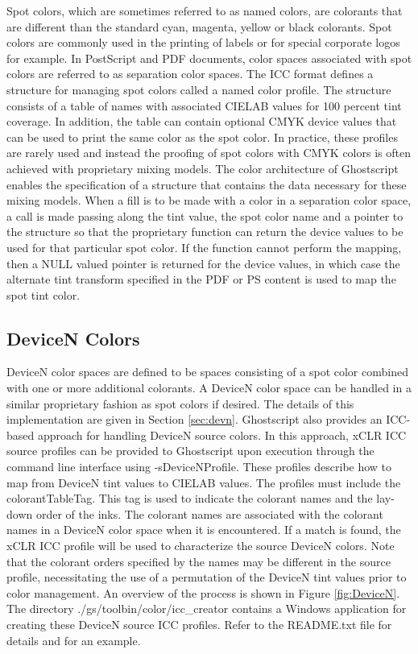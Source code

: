 \documentclass[12pt,notitlepage]{article}
\begin{document}
Spot colors, which are sometimes referred to as named colors, are colorants that are different than the standard cyan, magenta, yellow or black colorants.  Spot colors are commonly used in the printing of labels or for special corporate logos for example.  In PostScript and PDF documents, color spaces associated with spot colors are referred to as separation color spaces.  The ICC format defines a structure for managing spot colors called a named color profile.  The structure consists of a table of names with associated CIELAB values for 100 percent tint coverage.  In addition, the table can contain optional CMYK device values that can be used to print the same color as the spot color.  In practice, these profiles are rarely used and instead the proofing of spot colors with CMYK colors is often achieved with proprietary mixing models.  The color architecture of Ghostscript enables the specification of a structure that contains the data necessary for these mixing models.  When a fill is to be made with a color in a separation color space, a call is made passing along the tint value, the spot color name and a pointer to the structure so that the proprietary function can return the device values to be used for that particular spot color.  If the function cannot perform the mapping, then a NULL valued pointer is returned for the device values, in which case the alternate tint transform specified in the PDF or PS content is used to map the spot tint color.

\subsection{DeviceN Colors}

DeviceN color spaces are defined to be spaces consisting of a spot color combined with one or more additional colorants. A DeviceN color space can be handled in a similar proprietary fashion as spot colors if desired.
 The details of this implementation are given in Section \ref{sec:devn}.  Ghostscript also provides an ICC-based approach for handling DeviceN source colors.  In this approach, xCLR ICC source profiles can be provided to Ghostscript upon execution through the command line interface using -sDeviceNProfile.  These profiles describe how to map from DeviceN tint values to CIELAB values.  The profiles must include the colorantTableTag.  This tag is used to indicate the colorant names and the lay-down order of the inks.  The colorant names are associated with the colorant names in a DeviceN color space when it is encountered.  If a match is found, the xCLR ICC profile will be used to characterize the source DeviceN colors.  Note that the colorant orders specified by the names may be different in the source profile, necessitating the use of a permutation of the DeviceN tint values prior to color management.  An overview of the process is shown in Figure \ref{fig:DeviceN}.  The directory ./gs/toolbin/color/icc\_creator contains a Windows application for creating these DeviceN source ICC profiles.  Refer to the README.txt file for details and for an example.
\end{document}
